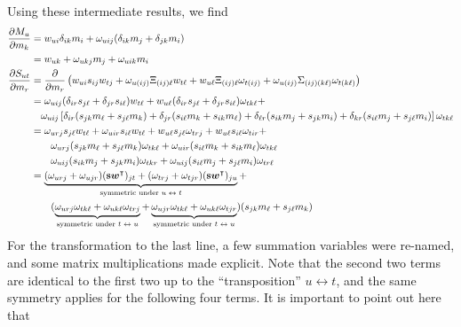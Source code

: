 \documentclass[a4paper]{article}
\newcommand{\bfs}{{\bf s}}
\newcommand{\T}{^{\top}}
\newcommand{\mat}[1]{\boldsymbol{#1}}
\newcommand{\bfw}{\mat{w}}
\newcommand{\<}{\langle}
\renewcommand{\>}{\rangle}
\renewcommand{\T}{^\intercal}%
\newcommand{\de}{\partial}
\begin{document}
Using these intermediate results, we find 
\begin{equation}
  \label{eq:11}
  \begin{aligned}
  \frac{\de M_u}{\de m_k} &= w_{ui} \delta_{ik} m_{i} + \omega_{uij}
  (\delta_{ik} m_j + \delta_{jk} m_i) \\
  &= w_{uk} + \omega_{ukj} m_j + \omega_{uik} m_i\\
  \frac{\de S_{ut}}{\de m_r} &=\frac{\de}{\de m_r} \left(
    w_{ui}s_{ij}w_{tj} + \omega_{u(ij)} \Xi_{(ij)\ell} w_{t\ell} +
    w_{u\ell} \Xi_{(ij) \ell} \omega_{t(ij)} + \omega_{u(ij)}
    \Sigma_{(ij)(k\ell)} \omega_{t(k\ell)} \right)\\
  &= \omega_{uij}(\delta_{ir} s_{j\ell} + \delta_{jr} s_{i\ell})
  w_{t\ell} + w_{u\ell} (\delta_{ir} s_{j\ell} + \delta_{jr}
  s_{i\ell}) \omega_{tk\ell} + \\
  &\quad \omega_{uij} \left[ \delta_{ir} (s_{jk}m_\ell + s_{j\ell}
    m_k) + \delta_{jr}(s_{i\ell}m_k + s_{ik}m_\ell) + \delta_{\ell
      r}(s_{ik} m_j + s_{jk}m_i) + \delta_{kr}(s_{i\ell} m_j +
    s_{j\ell}m_i)\right] \omega_{tk\ell}\\
  &= \omega_{urj} s_{j\ell}w_{t\ell} + \omega_{uir}s_{i\ell}w_{t\ell}
  + w_{u\ell}s_{j\ell}\omega_{trj} + w_{u\ell}s_{i\ell}\omega_{tir} +
  \\
  & \qquad \omega_{urj}(s_{jk}m_\ell + s_{j\ell}m_k) \omega_{tk\ell} +
  \omega_{uir}(s_{i\ell}m_k + s_{ik}m_\ell) \omega_{tk\ell} \\
  & \qquad \omega_{uij}(s_{ik}m_j + s_{jk}m_i) \omega_{tkr} +
  \omega_{uij} (s_{i\ell}m_j + s_{j\ell}m_i) \omega_{tr\ell}\\
 &= \underbrace{(\omega_{urj} + \omega_{ujr}) (\bfs\bfw\T)_{jt} +
 (\omega_{trj} + \omega_{tjr}) (\bfs\bfw\T)_{ju}}_{\text{symmetric
   under $u\leftrightarrow t$}} +\\
&\qquad (\underbrace{\omega_{urj} \omega_{tk\ell} + \omega_{uk\ell}
  \omega_{trj}}_{\text{symmetric under $t\leftrightarrow u$}} + \underbrace{\omega_{ujr} \omega_{tk\ell} +
\omega_{uk\ell} \omega_{tjr}} _{\text{symmetric under $t\leftrightarrow u$}}
) (s_{jk}m_\ell + s_{j\ell}m_k)
 \end{aligned}
\end{equation}
For the transformation to the last line, a few summation variables
were re-named, and some matrix multiplications made explicit. Note
that the second two terms are identical to the first two up to the
``transposition'' $u\leftrightarrow t$, and the same symmetry applies
for the following four terms. It is important to point out here that
\end{document}
